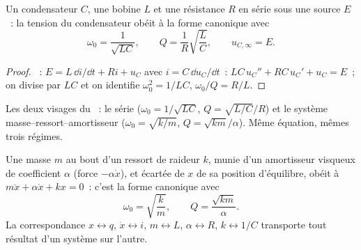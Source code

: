 \begin{proposition}\label{prop:b1:transient-regimes:rlc}
Un condensateur $C$, une bobine $L$ et une résistance $R$ en série sous
une source $E$~: la tension du condensateur obéit à la forme canonique avec
\[
\omega_0 = \frac{1}{\sqrt{LC}}, \qquad Q = \frac{1}{R}\sqrt{\frac{L}{C}},
\qquad u_{C,\infty} = E .
\]
\end{proposition}

\begin{proof}
~: $E = L\,\dd i/\dd t + Ri + u_C$ avec $i = C\,\dd u_C/\dd t$~:
$LC\,u_C'' + RC\,u_C' + u_C = E$~; on divise par $LC$ et on identifie
$\omega_0^2 = 1/LC$, $\omega_0/Q = R/L$.
\end{proof}

\begin{omfigure}

{\small Les deux visages du ~: le 
série ($\omega_0 = 1/\sqrt{LC}$, $Q = \sqrt{L/C}/R$) et le système
masse--ressort--amortisseur ($\omega_0 = \sqrt{k/m}$,
$Q = \sqrt{km}/\alpha$). Même équation, mêmes trois régimes.}
\end{omfigure}

\begin{proposition}\label{prop:b1:transient-regimes:mechanical}
Une masse $m$ au bout d'un ressort de raideur $k$, munie d'un
amortisseur visqueux de coefficient $\alpha$ (force $-\alpha\dot x$), et
écartée de $x$ de sa position d'équilibre, obéit à
$m\ddot x + \alpha\dot x + kx = 0$~: c'est la forme canonique avec
\[
\omega_0 = \sqrt{\frac{k}{m}}, \qquad Q = \frac{\sqrt{km}}{\alpha} .
\]
La correspondance $x \leftrightarrow q$, $\dot x \leftrightarrow i$,
$m \leftrightarrow L$, $\alpha \leftrightarrow R$, $k \leftrightarrow 1/C$
transporte tout résultat d'un système sur l'autre.
\end{proposition}

